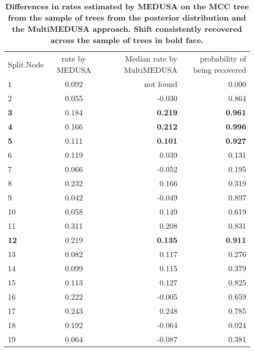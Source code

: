 \documentclass[10pt]{article}
\begin{document}
\begin{table}[!h]
    \caption{\bf{Differences in rates estimated by MEDUSA on the MCC
tree from the sample of trees from the posterior distribution and the
MultiMEDUSA approach. Shift consistently recovered across the
sample of trees in bold face.}}
\begin{tabular}{lcrr}
Split.Node & rate by MEDUSA & Median rate by MultiMEDUSA & probability of being recovered \\
1          & 0.092          & not found                  & 0.000                          \\
2          & 0.055          & -0.030                     & 0.864                          \\
\bf{3}     & 0.184          & \bf{0.219}                 & \bf{0.961}                     \\
\bf{4}     & 0.166          & \bf{0.212}                 & \bf{0.996}                     \\
\bf{5}     & 0.111          & \bf{0.101}                 & \bf{0.927}                     \\
6          & 0.119          & 0.039                      & 0.131                          \\
7          & 0.066          & -0.052                     & 0.195                          \\
8          & 0.232          & 0.166                      & 0.319                          \\
9          & 0.042          & -0.049                     & 0.897                          \\
10         & 0.058          & 0.149                      & 0.619                          \\
11         & 0.311          & 0.208                      & 0.831                          \\
\bf{12}    & 0.219          & \bf{0.135}                 & \bf{0.911}                     \\
13         & 0.082          & 0.117                      & 0.276                          \\
14         & 0.099          & 0.115                      & 0.379                          \\
15         & 0.113          & 0.127                      & 0.825                          \\
16         & 0.222          & -0.005                     & 0.659                          \\
17         & 0.243          & 0.248                      & 0.785                          \\
18         & 0.192          & -0.064                     & 0.024                          \\
19         & 0.064          & -0.087                     & 0.381                         
\end{tabular}
\end{table}
\end{document}

